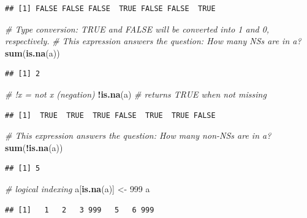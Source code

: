\documentclass[]{book}
\newenvironment{Shaded}{\begin{snugshade}}{\end{snugshade}}
\newcommand{\CommentTok}[1]{\textcolor[rgb]{0.56,0.35,0.01}{\textit{#1}}}
\newcommand{\DecValTok}[1]{\textcolor[rgb]{0.00,0.00,0.81}{#1}}
\newcommand{\KeywordTok}[1]{\textcolor[rgb]{0.13,0.29,0.53}{\textbf{#1}}}
\newcommand{\NormalTok}[1]{#1}
\newcommand{\OperatorTok}[1]{\textcolor[rgb]{0.81,0.36,0.00}{\textbf{#1}}}
\newcommand{\StringTok}[1]{\textcolor[rgb]{0.31,0.60,0.02}{#1}}
\begin{document}
\begin{verbatim}
## [1] FALSE FALSE FALSE  TRUE FALSE FALSE  TRUE
\end{verbatim}

\begin{Shaded}
\begin{Highlighting}[]
\CommentTok{# Type conversion: TRUE and FALSE will be converted into 1 and 0, respectively. }
\CommentTok{# This expression answers the question: How many NSs are in a?}
\KeywordTok{sum}\NormalTok{(}\KeywordTok{is.na}\NormalTok{(a))}
\end{Highlighting}
\end{Shaded}

\begin{verbatim}
## [1] 2
\end{verbatim}

\begin{Shaded}
\begin{Highlighting}[]
\CommentTok{# !x = not x (negation)}
\OperatorTok{!}\KeywordTok{is.na}\NormalTok{(a)  }\CommentTok{# returns TRUE when not missing}
\end{Highlighting}
\end{Shaded}

\begin{verbatim}
## [1]  TRUE  TRUE  TRUE FALSE  TRUE  TRUE FALSE
\end{verbatim}

\begin{Shaded}
\begin{Highlighting}[]
\CommentTok{# This expression answers the question: How many non-NSs are in a?}
\KeywordTok{sum}\NormalTok{(}\OperatorTok{!}\KeywordTok{is.na}\NormalTok{(a))}
\end{Highlighting}
\end{Shaded}

\begin{verbatim}
## [1] 5
\end{verbatim}

\begin{Shaded}
\begin{Highlighting}[]
\CommentTok{# logical indexing}
\NormalTok{a[}\KeywordTok{is.na}\NormalTok{(a)] <-}\StringTok{ }\DecValTok{999}
\NormalTok{a}
\end{Highlighting}
\end{Shaded}

\begin{verbatim}
## [1]   1   2   3 999   5   6 999
\end{verbatim}
\end{document}
